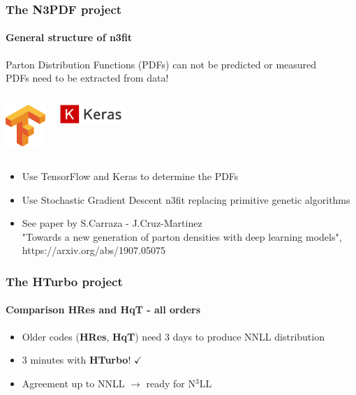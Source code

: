 \documentclass[aspectratio=43]{beamer}
\begin{document}
\begin{frame}
	
	\frametitle{The N3PDF project}
	\framesubtitle{General structure of n3fit}

	\footnotesize Parton Distribution Functions (PDFs) can not be predicted or measured\\
	{\color{red} PDFs need to be extracted from data!}

	\vspace{0.5cm}
	
	\begin{columns}
		
		
		\includegraphics[width = 1.5cm]{plots/section2/TF.png}
				
				
		\includegraphics[width = 2.5cm]{plots/section2/Keras.png}
		
	\end{columns}
	
	\vspace{0.5cm}
	
	\begin{itemize}
		\item \footnotesize Use TensorFlow and Keras to determine the PDFs
		\item \footnotesize Use Stochastic Gradient Descent {\color{violet} n3fit} replacing primitive genetic algorithms
	    \item \footnotesize See paper by S.Carraza - J.Cruz-Martinez \\
		\footnotesize {\color{blue}"Towards a new generation of parton densities with deep learning models",\\ https://arxiv.org/abs/1907.05075}
	\end{itemize}

\end{frame}

\begin{frame}
	
	\frametitle{The HTurbo project}
	\framesubtitle{Comparison HRes and HqT - all orders}

	\begin{itemize}
		\item \footnotesize Older codes (\textbf{HRes}, \textbf{HqT}) need 3 days to produce NNLL distribution
		\item {\color{blue} 3 minutes with \textbf{HTurbo}!} {\color{darkgreen}$\checkmark$} 
		\item \footnotesize Agreement up to NNLL $\longrightarrow$ {\color{blue}ready for N$^{3}$LL}
	\end{itemize}

\end{frame}
\end{document}
